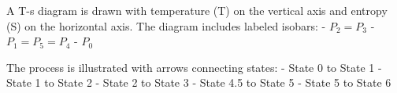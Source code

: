 A T-s diagram is drawn with temperature (T) on the vertical axis and entropy (S) on the horizontal axis. The diagram includes labeled isobars:  
- \( P_2 = P_3 \)  
- \( P_1 = P_5 = P_4 \)  
- \( P_0 \)  

The process is illustrated with arrows connecting states:  
- State 0 to State 1  
- State 1 to State 2  
- State 2 to State 3  
- State 4.5 to State 5  
- State 5 to State 6